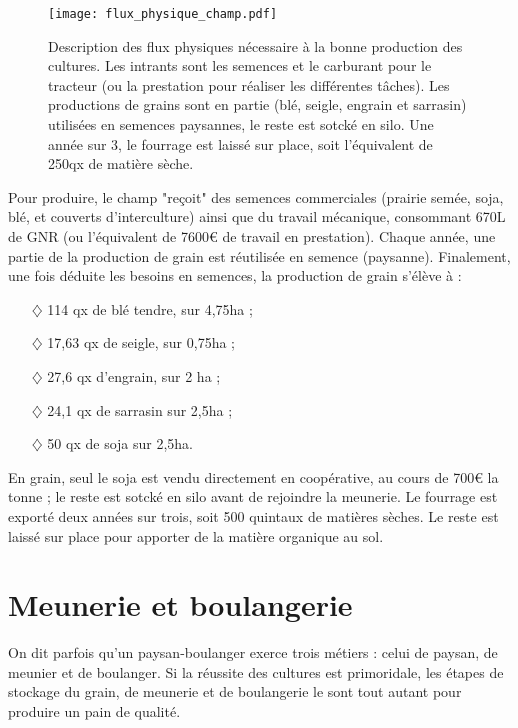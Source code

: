 \documentclass{book}
\begin{document}
\begin{figure}[h!]
\begin{center}
	\texttt{[image: flux\_physique\_champ.pdf]}
	\caption{Description des flux physiques nécessaire à la bonne production des cultures. Les intrants sont les semences et le carburant pour le tracteur (ou la prestation pour réaliser les différentes tâches). Les productions de grains sont en partie (blé, seigle, engrain et sarrasin) utilisées en semences paysannes, le reste est sotcké en silo. Une année sur 3, le fourrage est laissé sur place, soit l'équivalent de 250qx de matière sèche.}
	\label{fig:flux_champ}
\end{center}
\end{figure}

Pour produire, le champ "reçoit" des semences commerciales (prairie semée, soja, blé, et couverts d'interculture) ainsi que du travail mécanique, consommant 670L de GNR (ou l'équivalent de 7600\euro{} de travail en prestation). Chaque année, une partie de la production de grain est réutilisée en semence (paysanne). Finalement, une fois déduite les besoins en semences, la production de grain s'élève à :
\begin{itemize}

\item[$\diamondsuit$] 114 qx de blé tendre, sur 4,75ha ; 
\item[$\diamondsuit$] 17,63 qx de seigle, sur 0,75ha ; 
\item[$\diamondsuit$] 27,6 qx d'engrain, sur 2 ha ; 
\item[$\diamondsuit$] 24,1 qx de sarrasin sur 2,5ha ; 
\item[$\diamondsuit$] 50 qx de soja sur 2,5ha.

\end{itemize}
En grain, seul le soja est vendu directement en coopérative, au cours de 700\euro{} la tonne ; le reste est sotcké en silo avant de rejoindre la meunerie. Le fourrage est exporté deux années sur trois, soit 500 quintaux de matières sèches. Le reste est laissé sur place pour apporter de la matière organique au sol.

\chapter{Meunerie et boulangerie}
\label{chap:meunerie_boul}

On dit parfois qu'un paysan-boulanger exerce trois métiers : celui de paysan, de meunier et de boulanger. Si la réussite des cultures est primoridale, les étapes de stockage du grain, de meunerie et de boulangerie le sont tout autant pour produire un pain de qualité.
\end{document}

